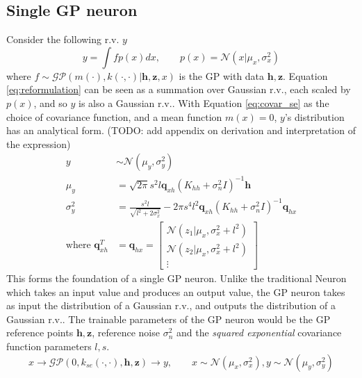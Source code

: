 \documentclass{article}
\begin{document}
\subsection{Single GP neuron}
Consider the following r.v. $y$
\begin{equation}
	y=\int f p(x)dx,\quad\quad p(x)=\mathcal{N}(x|\mu_x,\sigma_x^2)
    \label{eq:reformulation}
\end{equation}
where $f\sim\mathcal{GP}(m(\cdot),k(\cdot,\cdot)|\boldsymbol{h},\boldsymbol{z},x)$ is the GP with data $\boldsymbol{h},\boldsymbol{z}$. Equation \ref{eq:reformulation} can be seen as a summation over Gaussian r.v., each scaled by $p(x)$, and so $y$ is also a Gaussian r.v.. With Equation \ref{eq:covar_se} as the choice of covariance function, and a mean function $m(x)=0$, $y$'s distribution has an analytical form. (TODO: add appendix on derivation and interpretation of the expression)
\begin{equation}
    \begin{aligned}
        y&\sim\mathcal{N}(\mu_y, \sigma_y^2) \\
        \mu_y&=\sqrt{2\pi}s^2l\boldsymbol{q}_{xh}(K_{hh}+\sigma_n^2 I)^{-1}\boldsymbol{h} \\
        \sigma_y^2&=\frac{s^2l}{\sqrt{l^2+2\sigma_x^2}} - 2\pi s^4 l^2 \boldsymbol{q}_{xh}(K_{hh}+\sigma_n^2 I)^{-1}\boldsymbol{q}_{hx} \\
        \text{where }\boldsymbol{q}_{xh}^T&=\boldsymbol{q}_{hx}=\begin{bmatrix}
            \mathcal{N}(z_1|\mu_x,\sigma_x^2+l^2) \\
            \mathcal{N}(z_2|\mu_x,\sigma_x^2+l^2) \\
            \vdots
        \end{bmatrix}
        \label{eq:gpneuron}
    \end{aligned}
\end{equation}
This forms the foundation of a single GP neuron. Unlike the traditional Neuron \cite{ANN} which takes an input value and produces an output value, the GP neuron takes as input the distribution of a Gaussian r.v., and outputs the distribution of a Gaussian r.v.. The trainable parameters of the GP neuron would be the GP reference points $\boldsymbol{h}, \boldsymbol{z}$, reference noise $\sigma_n^2$ and the \textit{squared exponential} covariance function parameters $l, s$.
\begin{equation}
    x \rightarrow \mathcal{GP}(0, k_{se}(\cdot,\cdot), \boldsymbol{h}, \boldsymbol{z}) \rightarrow y,\quad\quad x\sim\mathcal{N}(\mu_x,\sigma_x^2),y\sim\mathcal{N}(\mu_y,\sigma_y^2)
\end{equation}
\end{document}
